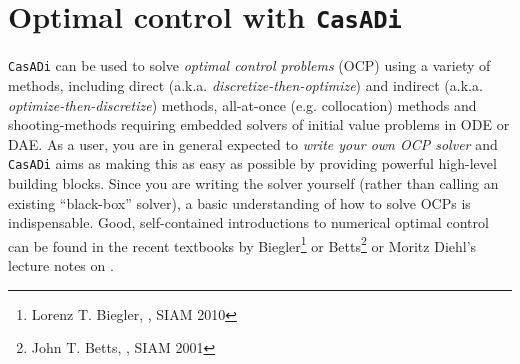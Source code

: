 \documentclass[a4paper,12pt]{book}
\newcommand{\CasADi}{\texttt{CasADi}\xspace}
\begin{document}
\chapter{Optimal control with \CasADi}
\CasADi can be used to solve \emph{optimal control problems} (OCP) using a variety of methods, including direct (a.k.a. \emph{discretize-then-optimize}) and indirect (a.k.a. \emph{optimize-then-discretize}) methods, all-at-once (e.g. collocation) methods and shooting-methods requiring embedded solvers of initial value problems in ODE or DAE. As a user, you are in general expected to \emph{write your own OCP solver} and \CasADi aims as making this as easy as possible by providing powerful high-level building blocks. Since you are writing the solver yourself (rather than calling an existing ``black-box'' solver), a basic understanding of how to solve OCPs is indispensable. Good, self-contained introductions to numerical optimal control can be found in the recent textbooks by Biegler\footnote{Lorenz T. Biegler, \emph{}, SIAM 2010} or Betts\footnote{John T. Betts, \emph{}, SIAM 2001} or Moritz Diehl's lecture notes on .
\end{document}
